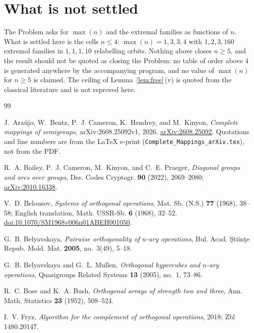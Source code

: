 \documentclass[11pt]{amsart}
\theoremstyle{remark}
\theoremstyle{definition}
\begin{document}
\section{What is not settled}

The Problem asks for $\max(n)$ and the extremal families as functions of $n$. What is settled here is
the cells $n\le4$: $\max(n)=1,3,3,4$ with $1,2,3,160$ extremal families in $1,1,1,10$ relabelling
orbits. Nothing above closes $n\ge5$, and the result should not be quoted as closing the Problem: no
table of order above $4$ is generated anywhere by the accompanying program, and no value of
$\max(n)$ for $n\ge5$ is claimed. The ceiling of Lemma~\ref{lem:free}\,(v) is quoted from the
classical literature and is not reproved here.

\begin{thebibliography}{99}

J.~Ara\'ujo, W.~Bentz, P.~J. Cameron, K.~Hendrey, and M.~Kinyon,
\emph{Complete mappings of semigroups},
arXiv:2608.25092v1, 2026.
\href{https://arxiv.org/abs/2608.25092}{arXiv:2608.25092}.
Quotations and line numbers are from the \LaTeX{} e-print
(\texttt{Complete\_Mappings\_arXiv.tex}), not from the PDF.

R.~A. Bailey, P.~J. Cameron, M.~Kinyon, and C.~E. Praeger,
\emph{Diagonal groups and arcs over groups},
Des. Codes Cryptogr. \textbf{90} (2022), 2069--2080;
\href{https://arxiv.org/abs/2010.16338}{arXiv:2010.16338}.

V.~D. Belousov,
\emph{Systems of orthogonal operations},
Mat. Sb. (N.S.) \textbf{77} (1968), 38--58;
English translation, Math. USSR-Sb. \textbf{6} (1968), 32--52.
\href{https://doi.org/10.1070/SM1968v006n01ABEH001050}{doi:10.1070/SM1968v006n01ABEH001050}.

G.~B. Belyavskaya,
\emph{Pairwise orthogonality of $n$-ary operations},
Bul. Acad. \c{S}tiin\c{t}e Repub. Mold. Mat. \textbf{2005}, no.~3(49), 5--18.

G.~B. Belyavskaya and G.~L. Mullen,
\emph{Orthogonal hypercubes and $n$-ary operations},
Quasigroups Related Systems \textbf{13} (2005), no.~1, 73--86.

R.~C. Bose and K.~A. Bush,
\emph{Orthogonal arrays of strength two and three},
Ann. Math. Statistics \textbf{23} (1952), 508--524.

I.~V. Fryz,
\emph{Algorithm for the complement of orthogonal operations},
2018; Zbl 1480.20147.


\end{thebibliography}
\end{document}
